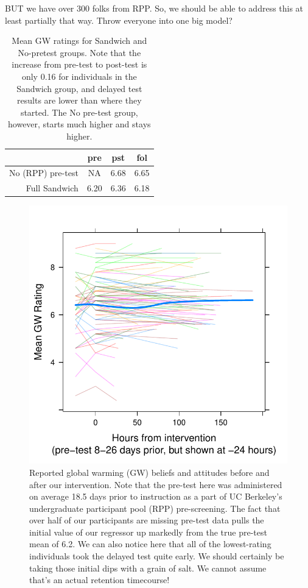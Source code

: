 BUT we have over 300 folks from RPP. So, we should be able to address this at
least partially that way. Throw everyone into one big model?


\begin{table}[ht]
\centering
\caption{Mean GW ratings for Sandwich and No-pretest groups. Note that the
    increase from pre-test to post-test is only 0.16 for individuals in the
    Sandwich group, and delayed test results are lower than where they started.
    The No pre-test group, however, starts much higher and stays higher.}
\label{table:RPP-mech-gw-breakdown}
\begin{tabular}{rccc}
  \toprule
 & pre & pst & fol \\ 
  \midrule
  No (RPP) pre-test & NA & 6.68 & 6.65 \\ 
  Full Sandwich & 6.20 & 6.36 & 6.18 \\ 
   \bottomrule
\end{tabular}
\end{table}

\begin{figure}
    \centering
    \includegraphics{RPP-mech-GW.pdf}
    \caption{Reported global warming (GW) beliefs and attitudes before and after
        our intervention. Note that the pre-test here was administered on
        average 18.5 days prior to instruction as a part of UC Berkeley's
        undergraduate participant pool (RPP) pre-screening. The fact that over
        half of our participants are missing pre-test data pulls the initial
        value of our regressor up markedly from the true pre-test mean of 6.2.
        We can also notice here that all of the lowest-rating individuals took
        the delayed test quite early. We should certainly be taking those
        initial dips with a grain of salt. We cannot assume that's an actual
        retention timecourse!}
\end{figure}


